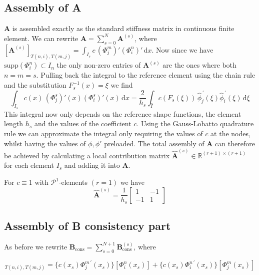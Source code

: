 \subsection{Assembly of A}
$\textbf{A}$ is assembled exactly as the standard stiffness matrix in continuous finite element.
We can rewrite $\textbf{A} = \sum_{s=0}^{N} \textbf{A}^{(s)}$, where
$[\textbf{A}^{(s)}]_{T(n,i),T(m,j)} = \int_{I_s} c \,(\Phi_j^m)' (\Phi_i^n)' \, \text{d}x$.
Now since we have $\text{supp}(\Phi_i^n)\subset I_n$ the only non-zero entries of $\textbf{A}^{(s)} $ are the ones where both $n=m=s$. Pulling back the integral
to the reference element using the chain rule and the substitution $F_s^{-1}(x) = \xi$ we find
\begin{equation*}
	\int_{I_s} c(x) \,(\Phi_j^s)'(x) (\Phi_i^s)'(x) \, \text{d}x =
	\frac{2}{h_s} \int_{\hat{I}} c(F_s(\xi)) \, \widehat{\phi}_j^{\, \prime}(\xi) \widehat{\phi}_i^{\, \prime}(\xi) \, \text{d}\xi
\end{equation*}
This integral now only depends on the reference shape functions, the element length $h_s$
and the values of the coefficient $c$. Using the Gauss-Lobatto quadrature rule we can approximate the integral
only requiring the values of $c$ at the nodes, whilst having the values of $\phi, \phi'$ preloaded.
The total assembly of $\textbf{A}$ can therefore be achieved by calculating a local contribution matrix
$\widehat{\textbf{A}}^{(s)} \in \mathbb{R}^{(r+1)\times (r+1)}$ for each element $I_s$ and adding it into $\textbf{A}$.
\begin{example}
	For $c\equiv 1$ with $\mathcal{P}^1$-elements $(r=1)$ we have
	\begin{equation*}
		\widehat{\textbf{A}}^{(s)} = \frac{1}{h_s}
		\begin{bmatrix}
			1  & -1 \\
			-1 & 1
		\end{bmatrix}
	\end{equation*}
\end{example}

\subsection{Assembly of B consistency part}
\label{subsec:assembly_cons}
As before we rewrite $\textbf{B}_{\text{cons}} = \sum_{s=0}^{N+1} \textbf{B}_{\text{cons}}^{(s)} $, where

\begin{equation*}
	[\textbf{B}_{\text{cons}}^{(s)}]_{T(n,i),T(m,j)} = \{c(x_s) \Phi_j^{m \, \prime} (x_s)\}[\Phi_i^n(x_s)] + \{c(x_s)\Phi_i^{n\, \prime} (x_s)\}[\Phi_j^m(x_s)]
\end{equation*}

